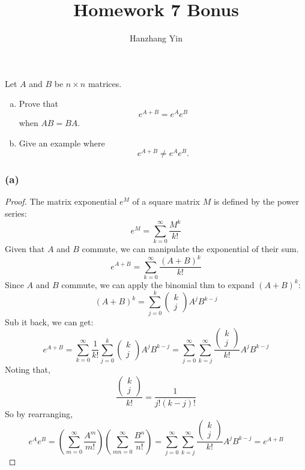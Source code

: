 \documentclass{article}
\title{\vspace{-4em}Homework 7 Bonus}
\author{Hanzhang Yin}
\begin{document}
\maketitle

\begin{problem}
    [Bonus]
        Let \(A\) and \(B\) be \(n\times n\) matrices.
        \begin{enumerate}[a)]
            \item Prove that
            \[e^{A+B} = e^Ae^B\]
            when \(AB=BA\).
            \item Give an example where
            \[e^{A+B} \neq e^Ae^B.\]
        \end{enumerate}
    \end{problem}
    
    \subsubsection*{(a)}
    \begin{proof}
        The matrix exponential $e^M$ of a square matrix $M$ is defined by the power series:
        \[ e^M = \sum_{k = 0}^{\infty} \frac{M^k}{k!} \]
        Given that $A$ and $B$ commute, we can manipulate the exponential of their sum.
        \[ e^{A + B} = \sum_{k = 0}^{\infty} \frac{(A + B)^k}{k!} \]
        Since $A$ and $B$ commute, we can apply the binomial thm to expand $(A + B)^k$:
        \[ (A + B)^k = \sum_{j = 0}^{k} \begin{pmatrix} k \\ j \end{pmatrix} A^j B^{k - j} \]
        Sub it back, we can get:
        \[ e^{A + B} = \sum_{k = 0}^{\infty} \frac{1}{k!} \sum_{j = 0}^{k} \begin{pmatrix} k \\ j \end{pmatrix} A^j B^{k - j} = \sum_{j = 0}^{\infty} \sum_{k = j}^{\infty} \frac{\begin{pmatrix} k \\ j \end{pmatrix}}{k!} A^j B^{k - j} \]
        Noting that,
        \[ \frac{\begin{pmatrix} k \\ j \end{pmatrix}}{k!} = \frac{1}{j!(k - j)!} \]
        So by rearranging,
        \[ e^{A} e^{B} = \left( \sum_{m = 0}^{\infty} \frac{A^m}{m!} \right) \left( \sum_{mn= 0}^{\infty} \frac{B^n}{n!} \right) = \sum_{j = 0}^{\infty} \sum_{k = j}^{\infty} \frac{\begin{pmatrix} k \\ j \end{pmatrix}}{k!} A^j B^{k - j} = e^{A + B} \]
    \end{proof}
    
\end{document}
